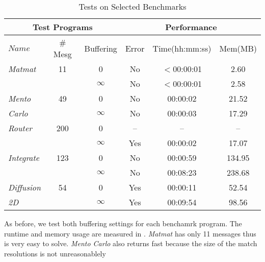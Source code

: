 \begin{table}[t]
\begin{center}
\scriptsize
\caption{Tests on Selected Benchmarks}\label{table:benchmarks}
\begin{tabular}{|l|c|c|c|c|c|}
		\hline
         \multicolumn{3}{|c|}{Test Programs} & \multicolumn{3}{|c|}{Performance} \\ \hline
          $Name$&\# Mesg&Buffering&Error&Time(hh:mm:ss)&Mem(MB) \\ \hline
           \textit{Matmat} & 11 & 0 & No & $<$00:00:01 & 2.60\\
          	      & &  $\infty$ & No & $<$00:00:01 & 2.58\\ \hline
	 \textit{Mento} & 49 & 0 & No & 00:00:02 & 21.52\\
          \textit{Carlo}  & & $\infty$ & No & 00:00:03 & 17.29 \\ \hline
	 \textit{Router}   & 200 & 0 & -- & -- & --\\
          	      & & $\infty$ & Yes & 00:00:02 & 17.07 \\ \hline
	 \textit{Integrate}  & 123 & 0 & No & 00:00:59 & 134.95 \\
          	      & &  $\infty$ & No & 00:08:23 & 238.68\\ \hline
	  \textit{Diffusion}  & 54 & 0 & Yes & 00:00:11 & 52.54 \\
           \textit{2D} &  & $\infty$ & Yes & 00:09:54 & 98.56\\ \hline          
          		\end{tabular}
\end{center}
\end{table}

As before, we test both buffering settings for each benchamrk program. The runtime and memory usage are  measured in . \textit{Matmat} has only 11 messages thus is very easy to solve. \textit{Mento Carlo} also returns fast because the size of the match resolutions is not unreasonablely 


